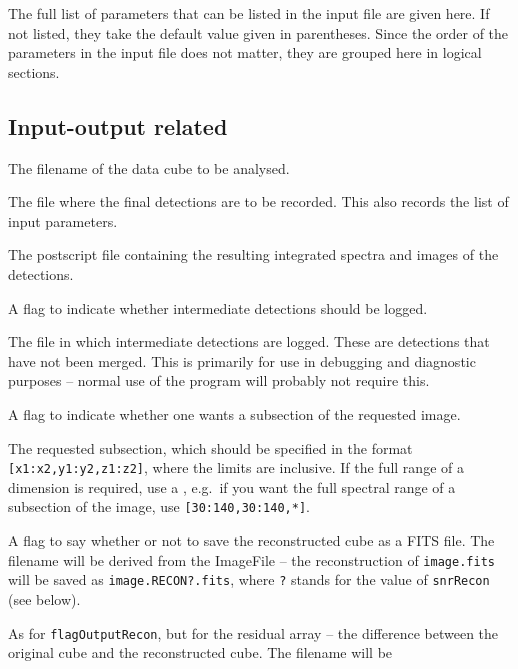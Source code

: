 \documentclass[12pt,a4paper]{article}
\newcommand{\eg}{e.g.\ }
\newcommand{\entrylabel}[1]{\mbox{\textsf{\bf{#1:}}}\hfil}
\newenvironment{entry}
        {\begin{list}{}%
                {\renewcommand{\makelabel}{\entrylabel}%
                        \setlength{\labelwidth}{30mm}%
                        \setlength{\labelsep}{5pt}%
                        \setlength{\itemsep}{2pt}%
                        \setlength{\parsep}{2pt}%
                        \setlength{\leftmargin}{35mm}%
                }%
        }%
{\end{list}}
\begin{document}
The full list of parameters that can be listed in the input file are
given here. If not listed, they take the default value given in
parentheses. Since the order of the parameters in the input file does
not matter, they are grouped here in logical sections.

\subsection*{Input-output related}
\begin{entry}
\item[ImageFile (no default assumed)] The filename of the
  data cube to be analysed.
\item[OutFile {\tt [./duchamp-Results]}] The file where the final
  detections are to be recorded. This also records the list of input
  parameters.
\item[SpectraFile {\tt [./duchamp-Spectra.ps]}] The postscript file
  containing the resulting integrated spectra and images of the
  detections. 
\item[flagLog {\tt [true]}] A flag to indicate whether intermediate
  detections should be logged.
\item[LogFile {\tt [./duchamp-Logfile]}] The file in which intermediate
  detections are logged. These are detections that have not been
  merged. This is primarily for use in debugging and diagnostic
  purposes -- normal use of the program will probably not require
  this.
\item[flagSubsection {\tt [false]}] A flag to indicate whether one
  wants a subsection of the requested image.
\item[Subsection {\tt [ [*,*,*] ]}] The requested subsection, which
  should be specified in the format {\tt [x1:x2,y1:y2,z1:z2]}, where
  the limits are inclusive. If the full range of a dimension is
  required, use a {\tt *}, \eg if you want the full spectral range of
  a subsection of the image, use {\tt [30:140,30:140,*]}.
\item[flagOutputRecon {\tt [false]}] A flag to say whether or not to
  save the reconstructed cube as a FITS file. The filename will be
  derived from the ImageFile -- the reconstruction of {\tt image.fits}
  will be saved as {\tt image.RECON?.fits}, where {\tt ?} stands for
  the value of {\tt snrRecon} (see below).
\item[flagOutputResid {\tt [false]}] As for {\tt flagOutputRecon}, but
  for the residual array -- the difference between the original cube
  and the reconstructed cube. The filename will be {\tt
}
\end{entry}
\end{document}
